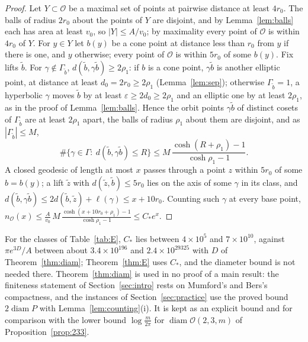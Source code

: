 \documentclass[pdflatex,sn-mathphys-num]{sn-jnl}
\theoremstyle{thmstyleone}%
\theoremstyle{thmstylethree}%
\newcommand{\Orb}{\mathcal{O}}
\newcommand{\diam}{\operatorname{diam}}
\begin{document}
\begin{proof}
Let $Y\subset\Orb$ be a maximal set of points at pairwise distance at least $4r_0$. The balls of radius $2r_0$ about the points of $Y$ are disjoint, and by Lemma~\ref{lem:balls} each has area at least $v_0$, so $|Y|\le A/v_0$; by maximality every point of $\Orb$ is within $4r_0$ of $Y$. For $y\in Y$ let $b(y)$ be a cone point at distance less than $r_0$ from $y$ if there is one, and $y$ otherwise; every point of $\Orb$ is within $5r_0$ of some $b(y)$. Fix lifts $\tilde b$. For $\gamma\notin\Gamma_{\tilde b}$, $d(\tilde b,\gamma\tilde b)\ge2\rho_1$: if $b$ is a cone point, $\gamma\tilde b$ is another elliptic point, at distance at least $d_0=2r_0\ge2\rho_1$ (Lemma~\ref{lem:sep}); otherwise $\Gamma_{\tilde b}=1$, a hyperbolic $\gamma$ moves $\tilde b$ by at least $\varepsilon\ge2d_0\ge2\rho_1$ and an elliptic one by at least $2\rho_1$, as in the proof of Lemma~\ref{lem:balls}. Hence the orbit points $\gamma\tilde b$ of distinct cosets of $\Gamma_{\tilde b}$ are at least $2\rho_1$ apart, the balls of radius $\rho_1$ about them are disjoint, and as $|\Gamma_{\tilde b}|\le M$,
\[
  \#\{\gamma\in\Gamma:\ d(\tilde b,\gamma\tilde b)\le R\}\le M\,\frac{\cosh(R+\rho_1)-1}{\cosh\rho_1-1}.
\]
A closed geodesic of length at most $x$ passes through a point $z$ within $5r_0$ of some $b=b(y)$; a lift $\tilde z$ with $d(\tilde z,\tilde b)\le5r_0$ lies on the axis of some $\gamma$ in its class, and $d(\tilde b,\gamma\tilde b)\le2d(\tilde b,\tilde z)+\ell(\gamma)\le x+10r_0$. Counting such $\gamma$ at every base point, $n_\Orb(x)\le\frac A{v_0}\,M\,\frac{\cosh(x+10r_0+\rho_1)-1}{\cosh\rho_1-1}\le C_*e^x$.
\end{proof}

For the classes of Table~\ref{tab:E}, $C_*$ lies between $4\times10^5$ and $7\times10^{10}$, against $\pi e^{3D}/A$ between about $3.4\times10^{196}$ and $2.4\times10^{29325}$ with $D$ of Theorem~\ref{thm:diam}; Theorem~\ref{thm:E} uses $C_*$, and the diameter bound is not needed there. Theorem~\ref{thm:diam} is used in no proof of a main result: the finiteness statement of Section~\ref{sec:intro} rests on Mumford's and Bers's compactness, and the instances of Section~\ref{sec:practice} use the proved bound $2\diam P$ with Lemma~\ref{lem:counting}(i). It is kept as an explicit bound and for comparison with the lower bound $\log\frac m{2\pi}$ for $\diam\Orb(2,3,m)$ of Proposition~\ref{prop:233}.
\end{document}

